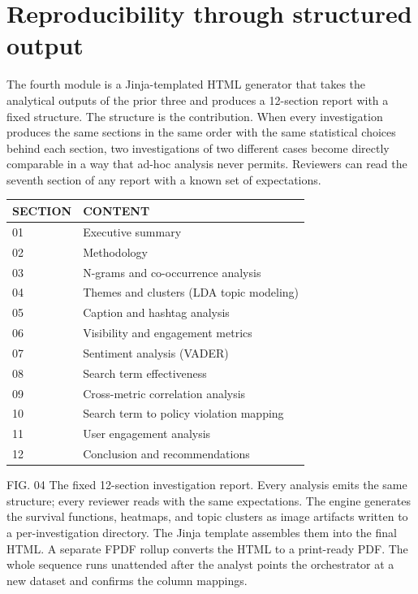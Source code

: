 \documentclass{obelus-preprint}
\begin{document}
\section{Reproducibility through structured output}
The fourth module is a Jinja-templated HTML generator that takes the analytical outputs of the prior three and produces a 12-section report with a fixed structure. The structure is the contribution. When every investigation produces the same sections in the same order with the same statistical choices behind each section, two investigations of two different cases become directly comparable in a way that ad-hoc analysis never permits. Reviewers can read the seventh section of any report with a known set of expectations.
\begin{center}
\begin{tabular}{ll}
\toprule
\textbf{SECTION} & \textbf{CONTENT} \\
\midrule
01 & Executive summary \\
02 & Methodology \\
03 & N-grams and co-occurrence analysis \\
04 & Themes and clusters (LDA topic modeling) \\
05 & Caption and hashtag analysis \\
06 & Visibility and engagement metrics \\
07 & Sentiment analysis (VADER) \\
08 & Search term effectiveness \\
09 & Cross-metric correlation analysis \\
10 & Search term to policy violation mapping \\
11 & User engagement analysis \\
12 & Conclusion and recommendations \\
\bottomrule
\end{tabular}
\end{center}
FIG. 04 The fixed 12-section investigation report. Every analysis emits the same structure; every reviewer reads with the same expectations.
The engine generates the survival functions, heatmaps, and topic clusters as image artifacts written to a per-investigation directory. The Jinja template assembles them into the final HTML. A separate FPDF rollup converts the HTML to a print-ready PDF. The whole sequence runs unattended after the analyst points the orchestrator at a new dataset and confirms the column mappings.
\end{document}
